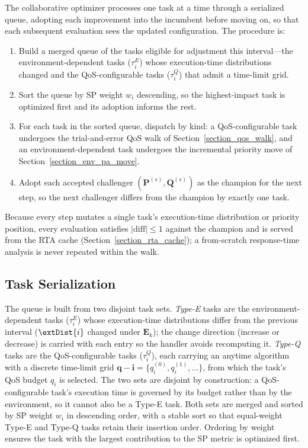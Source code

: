     The collaborative optimizer processes one task at a time through a serialized queue, adopting each improvement into the incumbent before moving on, so that each subsequent evaluation sees the updated configuration.
    The procedure is:
    \begin{enumerate}
        \item Build a merged queue of the tasks eligible for adjustment this interval---the environment-dependent tasks ($\tau^E_i$) whose execution-time distributions changed and the QoS-configurable tasks ($\tau^Q_i$) that admit a time-limit grid.
        \item Sort the queue by SP weight $w_i$ descending, so the highest-impact task is optimized first and its adoption informs the rest.
        \item For each task in the sorted queue, dispatch by kind: a QoS-configurable task undergoes the trial-and-error QoS walk of Section~\ref{section_qos_walk}, and an environment-dependent task undergoes the incremental priority move of Section~\ref{section_env_pa_move}.
        \item Adopt each accepted challenger $(\boldsymbol{P}^{(s)},\boldsymbol{Q}^{(s)})$ as the champion for the next step, so the next challenger differs from the champion by exactly one task.
    \end{enumerate}
    Because every step mutates a single task's execution-time distribution or priority position, every evaluation satisfies $|\mathrm{diff}| \leq 1$ against the champion and is served from the RTA cache (Section~\ref{section_rta_cache}); a from-scratch response-time analysis is never repeated within the walk.

    \subsection{Task Serialization}
    \label{section_task_serialization}

    The queue is built from two disjoint task sets.
    \textit{Type-E} tasks are the environment-dependent tasks ($\tau^E_i$) whose execution-time distributions differ from the previous interval ($\extDist{i}$ changed under $\textbf{E}_k$); the change direction (increase or decrease) is carried with each entry so the handler avoids recomputing it.
    \textit{Type-Q} tasks are the QoS-configurable tasks ($\tau^Q_i$), each carrying an anytime algorithm with a discrete time-limit grid $\boldsymbol{q-i} = \{q_i^{(0)}, q_i^{(1)}, \dots\}$, from which the task's QoS budget $q_i$ is selected.
    The two sets are disjoint by construction: a QoS-configurable task's execution time is governed by its budget rather than by the environment, so it cannot also be a Type-E task.
    Both sets are merged and sorted by SP weight $w_i$ in descending order, with a stable sort so that equal-weight Type-E and Type-Q tasks retain their insertion order.
    Ordering by weight ensures the task with the largest contribution to the SP metric is optimized first.

